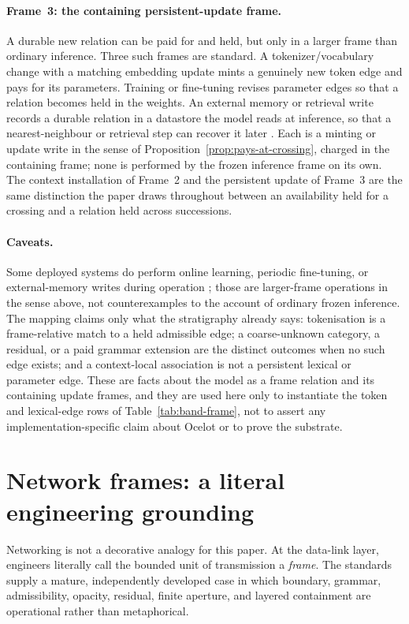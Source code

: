 \documentclass[11pt,a4paper]{article}
\theoremstyle{remark}\newtheorem{remark}[definition]{Remark}
\begin{document}
\paragraph{Frame~3: the containing persistent-update frame.} A durable new relation
can be paid for and held, but only in a larger frame than ordinary inference. Three
such frames are standard. A tokenizer/vocabulary change with a matching embedding
update mints a genuinely new token edge and pays for its parameters. Training or
fine-tuning revises parameter edges so that a relation becomes held in the weights.
An external memory or retrieval write records a durable relation in a datastore the
model reads at inference, so that a nearest-neighbour or retrieval step can recover
it later \citep{khandelwal2020}. Each is a minting or update write in the sense of
Proposition~\ref{prop:pays-at-crossing}, charged in the containing frame; none is
performed by the frozen inference frame on its own. The context installation of
Frame~2 and the persistent update of Frame~3 are the same distinction the paper
draws throughout between an availability held for a crossing and a relation held
across successions.

\paragraph{Caveats.} Some deployed systems do perform online learning, periodic
fine-tuning, or external-memory writes during operation
\citep{khandelwal2020}; those are larger-frame operations in the sense above, not
counterexamples to the account of ordinary frozen inference. The mapping claims
only what the stratigraphy already says: tokenisation is a frame-relative match to
a held admissible edge; a coarse-unknown category, a residual, or a paid grammar
extension are the distinct outcomes when no such edge exists; and a context-local
association is not a persistent lexical or parameter edge. These are facts about
the model as a frame relation and its containing update frames, and they are used
here only to instantiate the token and lexical-edge rows of
Table~\ref{tab:band-frame}, not to assert any implementation-specific claim about
Ocelot or to prove the substrate.


\section{Network frames: a literal engineering grounding}\label{sec:networking}

Networking is not a decorative analogy for this paper. At the data-link layer,
engineers literally call the bounded unit of transmission a \emph{frame}. The
standards supply a mature, independently developed case in which boundary,
grammar, admissibility, opacity, residual, finite aperture, and layered
containment are operational rather than metaphorical.
\end{document}

